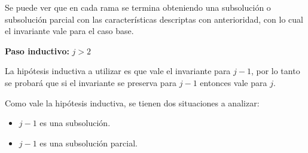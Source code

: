 \begin{enumerate}
{			Se puede ver que en cada rama se termina obteniendo una subsolución o
			subsolución parcial con las características descriptas con anterioridad,
			con lo cual el invariante vale para el caso base.

			\textbf{Paso inductivo:} $j > 2$

			La hipótesis inductiva a utilizar es que vale el invariante para $j - 1$,
			por lo tanto se probará que si el invariante se preserva para $j
			- 1$ entonces vale para $j$.

			Como vale la hipótesis inductiva, se tienen dos situaciones a analizar:

			\begin{itemize}
				\item{$j - 1$ es una subsolución.}
				\item{$j - 1$ es una subsolución parcial.}
			\end{itemize}

}
\end{enumerate}
